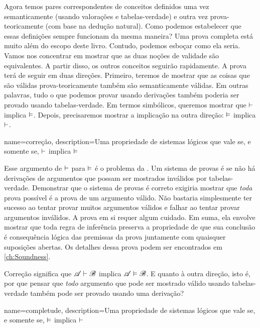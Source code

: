 Agora temos pares correspondentes de conceitos definidos uma vez
semanticamente (usando valorações e tabelas-verdade) e outra vez
prova-teoricamente (com base na dedução natural). Como podemos
estabelecer que essas definições sempre funcionam da mesma maneira? Uma
prova completa está muito além do escopo deste livro. Contudo, podemos
esboçar como ela seria. Vamos nos concentrar em mostrar que as duas noções
de validade são equivalentes. A partir disso, os outros conceitos seguirão
rapidamente. A prova terá de seguir em duas direções. Primeiro, teremos de
mostrar que as coisas que são válidas prova-teoricamente também são
semanticamente válidas. Em outras palavras, tudo o que podemos provar
usando derivações também poderia ser provado usando tabelas-verdade. Em
termos simbólicos, queremos mostrar que $\vdash$ implica
$\vDash$. Depois, precisaremos mostrar a implicação na outra direção:
$\vDash$ implica $\vdash$.

{
name=correção,
description={Uma propriedade de sistemas lógicos que vale se, e somente se, $\vdash $ implica $\vDash $}
}

Esse argumento de $\vdash $ para $\vDash $ é o problema da
.\label{def:soundness} Um sistema de provas é
 se não há derivações de argumentos que possam ser
mostrados inválidos por tabelas-verdade. \label{def_Soundness} Demonstrar
que o sistema de provas é correto exigiria mostrar que \emph{toda} prova
possível é a prova de um argumento válido. Não bastaria simplesmente ter
sucesso ao tentar provar muitos argumentos válidos e falhar ao tentar provar
argumentos inválidos. A prova em si requer algum cuidado. Em suma, ela
envolve mostrar que toda regra de inferência preserva a propriedade de que
sua conclusão é consequência lógica das premissas da prova juntamente com
quaisquer suposições abertas. Os detalhes dessa prova podem ser encontrados
em \cref{ch:Soundness}.

Correção significa que $\mathscr{A} \vdash \mathscr{B}$ implica $\mathscr{A}
\vDash \mathscr{B}$. E quanto à outra direção, isto é, por que pensar
que \emph{todo} argumento que pode ser mostrado válido usando tabelas-verdade
também pode ser provado usando uma derivação?

{
name=completude,
description={Uma propriedade de sistemas lógicos que vale se, e somente se, $\vDash $ implica $\vdash $}
}

